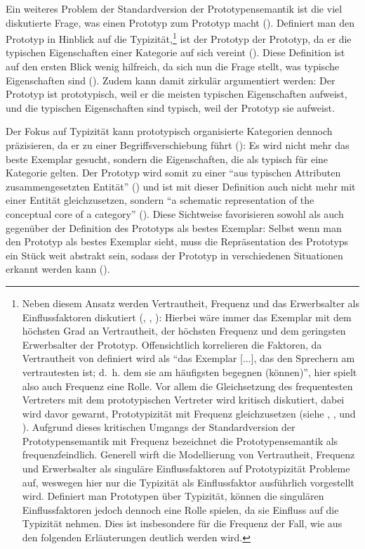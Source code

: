 Ein weiteres Problem der Standardversion der Prototypensemantik ist die viel diskutierte Frage, was einen Prototyp zum Prototyp macht (\cite[13]{Barenfanger.2002}). Definiert man den Prototyp in Hinblick auf die Typizität,\footnote{\label{freq}Neben diesem Ansatz werden Vertrautheit, Frequenz und das Erwerbsalter als Einflussfaktoren diskutiert (\cite[41--43; 51--54]{Kleiber.1993}, \cite[52--53]{Taylor.1995}, \cite[100]{Rosch.2004}): Hierbei wäre immer das Exemplar mit dem höchsten Grad an Vertrautheit, der höchsten Frequenz und dem geringsten Erwerbsalter der Prototyp. Offensichtlich korrelieren die Faktoren, da Vertrautheit von \textcite[42]{Kleiber.1993} definiert wird als "`das Exemplar [...], das den Sprechern am vertrautesten ist; d.~h. dem sie am häufigsten begegnen (können)"', hier spielt also auch Frequenz eine Rolle. Vor allem die Gleichsetzung des frequentesten Vertreters mit dem prototypischen Vertreter wird kritisch diskutiert, dabei wird davor gewarnt, Prototypizität mit Frequenz gleichzusetzen (siehe \cite[42]{Kleiber.1993}, \cite[52]{Taylor.1995}, \cite[50]{Schmid.2000} und \cite[567--568]{Taylor.2015}). Aufgrund dieses kritischen Umgangs der Standardversion der Prototypensemantik mit Frequenz bezeichnet \textcite[365]{FenkOczlon.1991} die Prototypensemantik als frequenzfeindlich. Generell wirft die Modellierung von Vertrautheit, Frequenz und Erwerbsalter als singuläre Einflussfaktoren auf Prototypizität Probleme auf, weswegen hier nur die Typizität als Einflussfaktor ausführlich vorgestellt wird. Definiert man Prototypen über Typizität, können die singulären Einflussfaktoren jedoch dennoch eine Rolle spielen, da sie Einfluss auf die Typizität nehmen. Dies ist insbesondere für die Frequenz der Fall, wie aus den folgenden Erläuterungen deutlich werden wird.} ist der Prototyp der Prototyp, da er die typischen Eigenschaften einer Kategorie auf sich vereint (\cite[42]{Kleiber.1993}). Diese Definition ist auf den ersten Blick wenig hilfreich, da sich nun die Frage stellt, was typische Eigenschaften sind (\cite[42]{Kleiber.1993}). Zudem kann damit zirkulär argumentiert werden: Der Prototyp ist prototypisch, weil er die meisten typischen Eigenschaften aufweist, und die typischen Eigenschaften sind typisch, weil der Prototyp sie aufweist.

Der Fokus auf Typizität kann prototypisch organisierte Kategorien dennoch präzisieren, da er zu einer Begriffsverschiebung führt (\cite[43]{Kleiber.1993}): Es wird nicht mehr das beste Exemplar gesucht, sondern die Eigenschaften, die als typisch für eine Kategorie gelten. Der Prototyp wird somit zu einer "`aus typischen Attributen zusammengesetzten Entität"' (\cite[43]{Kleiber.1993}) und ist mit dieser Definition auch nicht mehr mit einer Entität gleichzusetzen, sondern "`a schematic representation of the conceptual core of a category"' (\cite[59]{Taylor.1995}). Diese Sichtweise favorisieren sowohl \textcite[43]{Kleiber.1993} als auch \textcite[59--60]{Taylor.1995} gegenüber der Definition des Prototyps als bestes Exemplar: Selbst wenn man den Prototyp als bestes Exemplar sieht, muss die Repräsentation des Prototyps ein Stück weit abstrakt sein, sodass der Prototyp in verschiedenen Situationen erkannt werden kann (\cite[60]{Taylor.1995}).\largerpage

